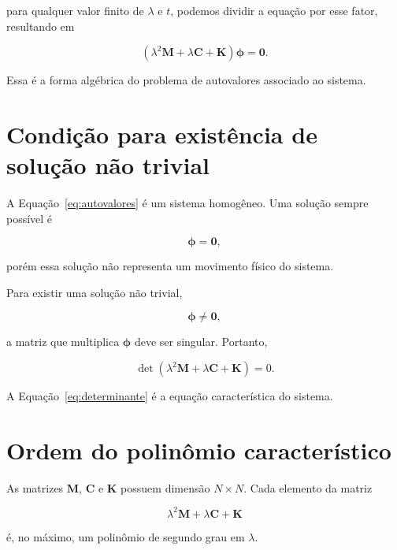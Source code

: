 \documentclass[12pt,a4paper]{article}
\begin{document}
para qualquer valor finito de $\lambda$ e $t$, podemos dividir a equação por
esse fator, resultando em

\begin{equation}
\boxed{
\left(
\lambda^2\mathbf{M}
+
\lambda\mathbf{C}
+
\mathbf{K}
\right)\boldsymbol{\phi}
=\mathbf{0}
}.
\label{eq:autovalores}
\end{equation}

Essa é a forma algébrica do problema de autovalores associado ao sistema.

\section{Condição para existência de solução não trivial}

A Equação~\eqref{eq:autovalores} é um sistema homogêneo. Uma solução sempre
possível é

\begin{equation}
\boldsymbol{\phi}=\mathbf{0},
\end{equation}

porém essa solução não representa um movimento físico do sistema.

Para existir uma solução não trivial,

\begin{equation}
\boldsymbol{\phi}\neq\mathbf{0},
\end{equation}

a matriz que multiplica $\boldsymbol{\phi}$ deve ser singular. Portanto,

\begin{equation}
\boxed{
\det\left(
\lambda^2\mathbf{M}
+
\lambda\mathbf{C}
+
\mathbf{K}
\right)=0
}.
\label{eq:determinante}
\end{equation}

A Equação~\eqref{eq:determinante} é a equação característica do sistema.

\section{Ordem do polinômio característico}

As matrizes $\mathbf{M}$, $\mathbf{C}$ e $\mathbf{K}$ possuem dimensão
$N\times N$. Cada elemento da matriz

\begin{equation}
\lambda^2\mathbf{M}
+\lambda\mathbf{C}
+\mathbf{K}
\end{equation}

é, no máximo, um polinômio de segundo grau em $\lambda$.
\end{document}
